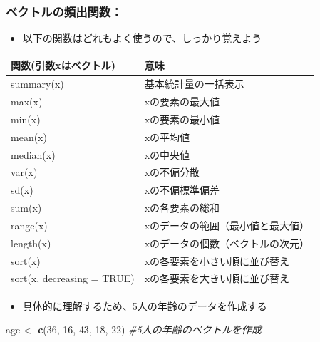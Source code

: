 \documentclass[
]{book}
\newenvironment{Shaded}{\begin{snugshade}}{\end{snugshade}}
\newcommand{\CommentTok}[1]{\textcolor[rgb]{0.56,0.35,0.01}{\textit{#1}}}
\newcommand{\DecValTok}[1]{\textcolor[rgb]{0.00,0.00,0.81}{#1}}
\newcommand{\FunctionTok}[1]{\textcolor[rgb]{0.13,0.29,0.53}{\textbf{#1}}}
\newcommand{\NormalTok}[1]{#1}
\newcommand{\OtherTok}[1]{\textcolor[rgb]{0.56,0.35,0.01}{#1}}
\providecommand{\tightlist}{%
  \setlength{\itemsep}{0pt}\setlength{\parskip}{0pt}}
\begin{document}
\hypertarget{ux30d9ux30afux30c8ux30ebux306eux983bux51faux95a2ux6570}{%
\subsubsection*{ベクトルの頻出関数：}\label{ux30d9ux30afux30c8ux30ebux306eux983bux51faux95a2ux6570}}

\begin{itemize}
\tightlist
\item
  以下の関数はどれもよく使うので、しっかり覚えよう
\end{itemize}

\begin{longtable}[]{@{}ll@{}}
\toprule\noalign{}
関数(引数xはベクトル) & 意味 \\
\midrule\noalign{}
\endhead
\bottomrule\noalign{}
\endlastfoot
summary(x) & 基本統計量の一括表示 \\
max(x) & xの要素の最大値 \\
min(x) & xの要素の最小値 \\
mean(x) & xの平均値 \\
median(x) & xの中央値 \\
var(x) & xの不偏分散 \\
sd(x) & xの不偏標準偏差 \\
sum(x) & xの各要素の総和 \\
range(x) & xのデータの範囲（最小値と最大値） \\
length(x) & xのデータの個数（ベクトルの次元） \\
sort(x) & xの各要素を小さい順に並び替え \\
sort(x, decreasing = TRUE) & xの各要素を大きい順に並び替え \\
\end{longtable}

\begin{itemize}
\tightlist
\item
  具体的に理解するため、5人の年齢のデータを作成する
\end{itemize}

\begin{Shaded}
\begin{Highlighting}[]
\NormalTok{age }\OtherTok{\textless{}{-}} \FunctionTok{c}\NormalTok{(}\DecValTok{36}\NormalTok{, }\DecValTok{16}\NormalTok{, }\DecValTok{43}\NormalTok{, }\DecValTok{18}\NormalTok{, }\DecValTok{22}\NormalTok{) }\CommentTok{\#5人の年齢のベクトルを作成}
\end{Highlighting}
\end{Shaded}
\end{document}
